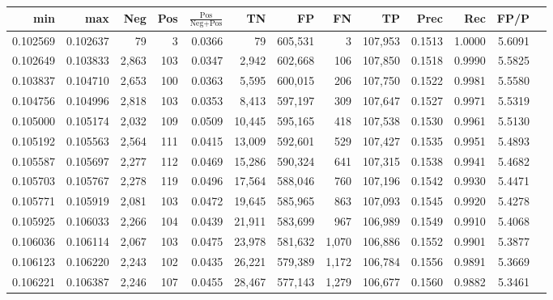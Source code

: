 \begin{tabular}{rrrrrrrrrrrrr}
\toprule
     min &      max &   Neg & Pos & $\frac{\text{Pos}}{\text{Neg}+\text{Pos}}$ &      TN &      FP &      FN &      TP &   Prec &    Rec &   FP/P \\
\midrule
0.102569 & 0.102637 &    79 &   3 &                                     0.0366 &      79 & 605,531 &       3 & 107,953 & 0.1513 & 1.0000 & 5.6091 \\
0.102649 & 0.103833 & 2,863 & 103 &                                     0.0347 &   2,942 & 602,668 &     106 & 107,850 & 0.1518 & 0.9990 & 5.5825 \\
0.103837 & 0.104710 & 2,653 & 100 &                                     0.0363 &   5,595 & 600,015 &     206 & 107,750 & 0.1522 & 0.9981 & 5.5580 \\
0.104756 & 0.104996 & 2,818 & 103 &                                     0.0353 &   8,413 & 597,197 &     309 & 107,647 & 0.1527 & 0.9971 & 5.5319 \\
0.105000 & 0.105174 & 2,032 & 109 &                                     0.0509 &  10,445 & 595,165 &     418 & 107,538 & 0.1530 & 0.9961 & 5.5130 \\
0.105192 & 0.105563 & 2,564 & 111 &                                     0.0415 &  13,009 & 592,601 &     529 & 107,427 & 0.1535 & 0.9951 & 5.4893 \\
0.105587 & 0.105697 & 2,277 & 112 &                                     0.0469 &  15,286 & 590,324 &     641 & 107,315 & 0.1538 & 0.9941 & 5.4682 \\
0.105703 & 0.105767 & 2,278 & 119 &                                     0.0496 &  17,564 & 588,046 &     760 & 107,196 & 0.1542 & 0.9930 & 5.4471 \\
0.105771 & 0.105919 & 2,081 & 103 &                                     0.0472 &  19,645 & 585,965 &     863 & 107,093 & 0.1545 & 0.9920 & 5.4278 \\
0.105925 & 0.106033 & 2,266 & 104 &                                     0.0439 &  21,911 & 583,699 &     967 & 106,989 & 0.1549 & 0.9910 & 5.4068 \\
0.106036 & 0.106114 & 2,067 & 103 &                                     0.0475 &  23,978 & 581,632 &   1,070 & 106,886 & 0.1552 & 0.9901 & 5.3877 \\
0.106123 & 0.106220 & 2,243 & 102 &                                     0.0435 &  26,221 & 579,389 &   1,172 & 106,784 & 0.1556 & 0.9891 & 5.3669 \\
0.106221 & 0.106387 & 2,246 & 107 &                                     0.0455 &  28,467 & 577,143 &   1,279 & 106,677 & 0.1560 & 0.9882 & 5.3461 \\

\end{tabular}

